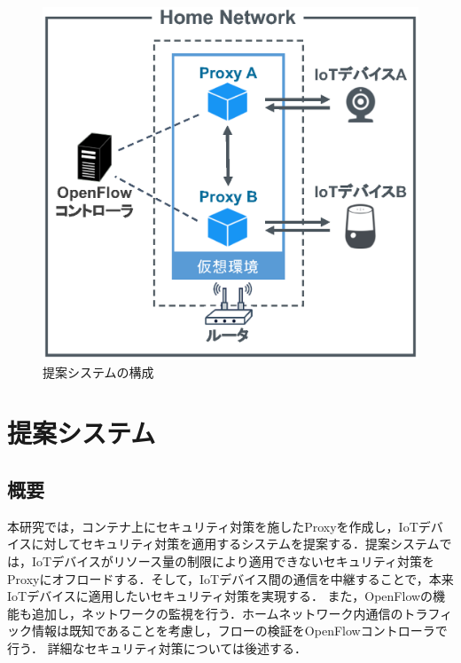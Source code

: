 \documentclass[Japanese]{dicomopapers}
\begin{document}
\begin{figure}[!tb]
	\centering
	\includegraphics[width=\linewidth]{img/system.eps}
	\caption{提案システムの構成}
	\label{fig:system}
\end{figure}


\section{提案システム}
\subsection{概要}
本研究では，コンテナ上にセキュリティ対策を施したProxyを作成し，IoTデバイスに対してセキュリティ対策を適用するシステムを提案する．提案システムでは，IoTデバイスがリソース量の制限により適用できないセキュリティ対策をProxyにオフロードする．そして，IoTデバイス間の通信を中継することで，本来IoTデバイスに適用したいセキュリティ対策を実現する．
また，OpenFlowの機能も追加し，ネットワークの監視を行う．ホームネットワーク内通信のトラフィック情報は既知であることを考慮し，フローの検証をOpenFlowコントローラで行う．
詳細なセキュリティ対策については後述する．
\end{document}
